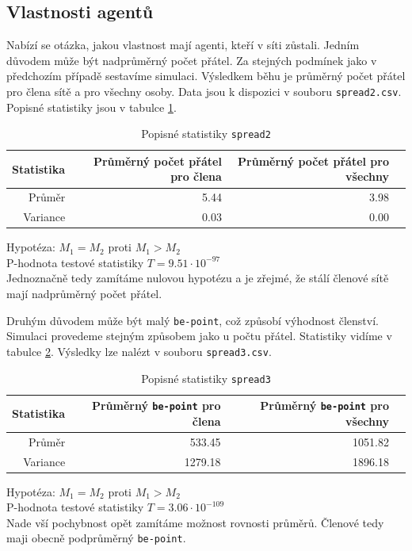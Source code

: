 \documentclass[a4wide,12pt]{report}
\begin{document}
\subsection{Vlastnosti agentů}
Nabízí se otázka, jakou vlastnost mají agenti, kteří v síti zůstali. Jedním důvodem může být nadprůměrný počet přátel. Za stejných podmínek jako v předchozím případě sestavíme simulaci. Výsledkem běhu je průměrný počet přátel pro člena sítě a pro všechny osoby. Data jsou k dispozici v souboru \texttt{spread2.csv}. Popisné statistiky jsou v tabulce \ref{tab:spread2_desc}.
\begin{table}[H]
  \begin{center}
  \begin{tabular}{|r|r|r|r|}
  \hline
  Statistika&Průměrný počet přátel pro člena	&Průměrný počet přátel pro všechny\\\hline
  Průměr	&5.44	&3.98\\

  Variance	&0.03	&0.00\\\hline
  \end{tabular}
  \end{center}
  \caption{Popisné statistiky \texttt{spread2}}
  \label{tab:spread2_desc}
\end{table}
\noindent
Hypotéza: $M_1=M_2$ proti $M_1>M_2$\\
P-hodnota testové statistiky $T = 9.51\cdot 10^{-97}$\\
Jednoznačně tedy zamítáme nulovou hypotézu a je zřejmé, že stálí členové sítě mají nadprůměrný počet přátel.\vspace{3mm}

Druhým důvodem může být malý \texttt{be-point}, což způsobí výhodnost členství. Simulaci provedeme stejným způsobem jako u počtu přátel. Statistiky vidíme v tabulce \ref{tab:spread3_desc}. Výsledky lze nalézt v souboru \texttt{spread3.csv}.
\begin{table}[H]
  \begin{center}
  \begin{tabular}{|r|r|r|r|}
  \hline
  Statistika&Průměrný \texttt{be-point} pro člena	&Průměrný \texttt{be-point} pro všechny\\\hline
  Průměr	&533.45	&1051.82\\

  Variance	&1279.18	&1896.18\\\hline
  \end{tabular}
  \end{center}
  \caption{Popisné statistiky \texttt{spread3}}
  \label{tab:spread3_desc}
\end{table}
\noindent
Hypotéza: $M_1=M_2$ proti $M_1>M_2$\\
P-hodnota testové statistiky $T = 3.06\cdot 10^{-109}$\\
Nade vší pochybnost opět zamítáme možnost rovnosti průměrů. Členové tedy maji obecně podprůměrný \texttt{be-point}.\vspace{3mm}
\end{document}
